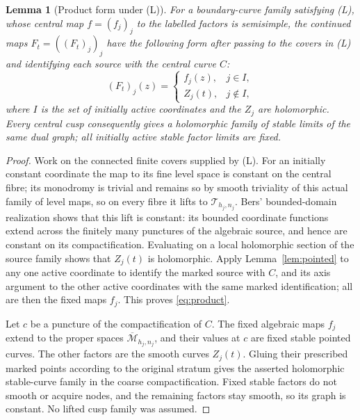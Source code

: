 \documentclass[12pt]{article}
\newcommand{\M}{\mathcal M}
\newcommand{\T}{\mathcal T}
\newcommand{\cl}[1]{\overline{#1}}
\newtheorem{lemma}[theorem]{Lemma}
\theoremstyle{remark}
\begin{document}
\begin{lemma}[Product form under (L)]\label{lem:curve}
For a boundary-curve family satisfying (L), whose central map
\(f=(f_j)_j\) to the labelled factors is semisimple, the continued
maps \(F_t=((F_t)_j)_j\) have the following form after passing
to the covers in (L) and identifying each source with the central
curve \(C\):
\begin{equation}\label{eq:product}
 (F_t)_j(z)=
 \begin{cases}
 f_j(z),&j\in I,\\
 Z_j(t),&j\notin I,
 \end{cases}
\end{equation}
where \(I\) is the set of initially active coordinates and the
\(Z_j\) are holomorphic. Every central cusp consequently gives a
holomorphic family of stable limits of the same dual graph; all
initially active stable factor limits are fixed.
\end{lemma}

\begin{proof}
Work on the connected finite covers supplied by (L). For an
initially constant coordinate the map to its fine level space is
constant on the central fibre; its monodromy is trivial and
remains so by smooth triviality of this actual family of level
maps, so on every fibre it lifts to \(\T_{h_j,n_j}\).
Bers' bounded-domain realization
\cite[Section 6]{BersFinite} shows that this lift
is constant: its bounded coordinate functions extend across the
finitely many punctures of the algebraic source, and hence are
constant on its compactification. Evaluating on a local
holomorphic section of the source family shows that
\(Z_j(t)\) is holomorphic.
Apply Lemma~\ref{lem:pointed} to any one active coordinate to
identify the marked source with \(C\), and its axis argument
to the other active coordinates with the same marked
identification; all are then the fixed maps \(f_j\). This proves
\eqref{eq:product}.

Let \(c\) be a puncture of the compactification of \(C\).
The fixed algebraic maps \(f_j\) extend to the proper spaces
\(\cl{\M}_{h_j,n_j}\), and their values at \(c\) are fixed stable
pointed curves. The other factors are the smooth curves \(Z_j(t)\).
Gluing their prescribed marked points according to the original
stratum gives the asserted holomorphic stable-curve family
in the coarse compactification. Fixed stable factors do not
smooth or acquire nodes, and the remaining factors stay smooth,
so its graph is constant. No lifted cusp family was assumed.
\end{proof}
\end{document}
